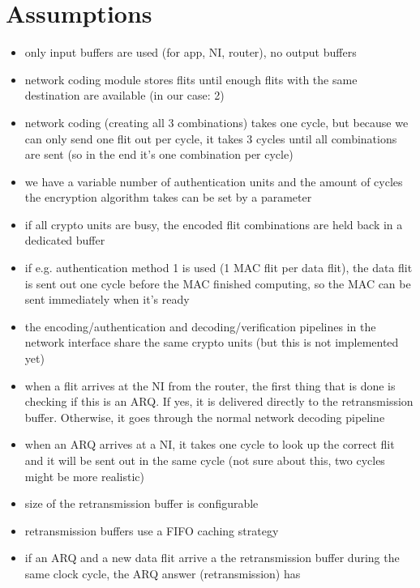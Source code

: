 \documentclass[
	paper=a4,
	fontsize=11pt,
	parskip=full %
]{scrreprt}
\begin{document}
    \section{Assumptions}
    \begin{itemize}
        \item only input buffers are used (for app, NI, router), no output buffers
        \item network coding module stores flits until enough flits with the same
            destination are available (in our case: 2)
        \item network coding (creating all 3 combinations) takes one cycle, but
            because we can only send one flit out per cycle, it takes 3 cycles until
            all combinations are sent (so in the end it's one combination per cycle)
        \item we have a variable number of authentication units and the amount of
            cycles the encryption algorithm takes can be set by a parameter
        \item if all crypto units are busy, the encoded flit combinations are held
            back in a dedicated buffer
        \item if e.g. authentication method 1 is used (1 MAC flit per data flit),
            the data flit is sent out one cycle before the MAC finished computing,
            so the MAC can be sent immediately when it's ready
        \item the encoding/authentication and decoding/verification pipelines in the
            network interface share the same crypto units (but this is not
            implemented yet)
        \item when a flit arrives at the NI from the router, the first thing that is
            done is checking if this is an ARQ. If yes, it is delivered directly to
            the retransmission buffer. Otherwise, it goes through the normal network
            decoding pipeline
        \item when an ARQ arrives at a NI, it takes one cycle to look up the correct
            flit and it will be sent out in the same cycle (not sure about this, two
            cycles might be more realistic)
        \item size of the retransmission buffer is configurable
        \item retransmission buffers use a FIFO caching strategy
        \item if an ARQ and a new data flit arrive a the retransmission buffer
            during the same clock cycle, the ARQ answer (retransmission) has

\end{itemize}
\end{document}
